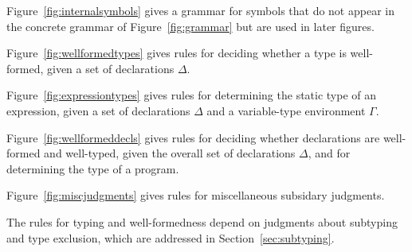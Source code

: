 Figure~\ref{fig:internalsymbols} gives a grammar for symbols that do not appear in the concrete grammar
of Figure~\ref{fig:grammar} but are used in later figures.

Figure~\ref{fig:wellformedtypes} gives rules for deciding whether a type is well-formed, given a set of declarations $\Delta$.

Figure~\ref{fig:expressiontypes} gives rules for determining the static type of an expression, given a set of declarations $\Delta$ and a variable-type environment $\Gamma$.



Figure~\ref{fig:wellformeddecls} gives rules for deciding whether declarations are well-formed and well-typed, given the overall set of declarations $\Delta$,
and for determining the type of a program.



Figure~\ref{fig:miscjudgments} gives rules for miscellaneous subsidary judgments.

The rules for typing and well-formedness depend on judgments about subtyping and type exclusion, which are addressed in Section~\ref{sec:subtyping}.

